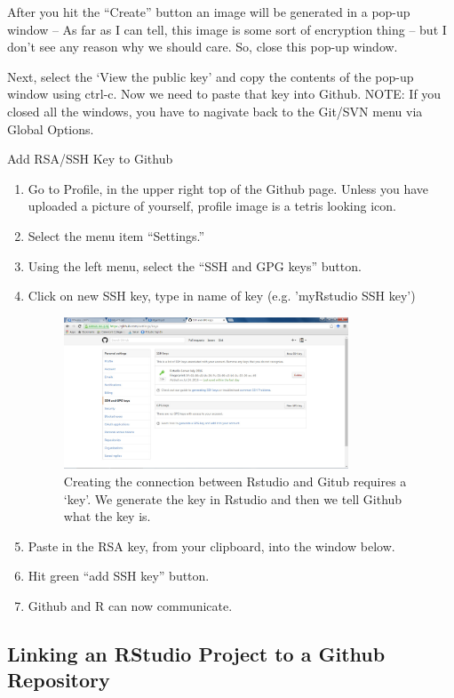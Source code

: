 \documentclass[12pt]{../SOP4_alpha}\usepackage[]{graphicx}\usepackage[]{color}
\begin{document}
\NP After you hit the ``Create'' button an image will be generated in a pop-up window -- As far as I can tell, this image is some sort of encryption thing -- but I don't see any reason why we should care. So, close this pop-up window. 

\NP Next, select the `View the public key' and copy the contents of the pop-up window using ctrl-c. Now we need to paste that key into Github. NOTE: If you closed all the windows, you have to nagivate back to the Git/SVN menu via Global Options. 

\NP Add RSA/SSH Key to Github
  \begin{enumerate}
  \item Go to Profile, in the upper right top of the Github page. Unless you have uploaded a picture of yourself, profile image is a tetris looking icon.
  \item Select the menu item ``Settings.''
  \item Using the left menu, select the ``SSH and GPG keys'' button.
  \item Click on new SSH key, type in name of key (e.g. 'myRstudio SSH key')
  
\begin{figure}
\centering
\includegraphics[width=0.8\textwidth]{graphics/Github_SavedSSH.jpg}
\caption{Creating the connection between Rstudio and Gitub requires a `key'. We generate the key in Rstudio and then we tell Github what the key is.}
\end{figure}

  \item Paste in the RSA key, from your clipboard, into the window below.
  \item Hit green ``add SSH key'' button.
  \item Github and R can now communicate.
  \end{enumerate}


\subsection{Linking an RStudio Project to a Github Repository}
\end{document}
